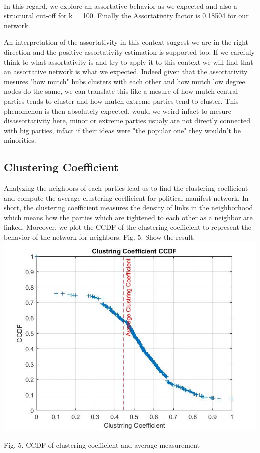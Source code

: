 \documentclass{article}%
\begin{document}
~
\\

In this regard, we explore an assortative behavior as we expected and also a structural cut-off for k = 100. Finally the Assortativity factor is 0.18504 for our network.

An interpretation of the assortativity in this context suggest we are in the right direction and the positive assortativity estimation is supported too. If we carefuly think to what assortativity is and try to apply it to this context we will find that an assortative network is what we expected. Indeed given that the assortativity mesures "how mutch" hubs clusters with each other and how mutch low degree nodes do the same, we can translate this like a mesure of how mutch central parties tends to cluster and how mutch extreme parties tend to cluster. This phenomenon is then absolutely expected, would we weird infact to mesure disassortativity here, minor or extreme parties usualy are not directly connected with big parties, infact if their ideas were "the popular one" they wouldn't be minorities.

\subsection*{Clustering Coefficient}

Analyzing the neighbors of each parties lead us to find the clustering coefficient and compute the average clustering coefficient for political manifest network. In short, the clustering coefficient measures the density of links in the neighborhood which means how the parties which are tightened to each other as a neighbor are linked. Moreover, we plot the CCDF of the clustering coefficient to represent the behavior of the network for neighbors. Fig. 5. Show the result.
\\



\includegraphics[scale=0.5]{Clustering_Coefficient}
\begin{center}
\begin{small}
Fig. 5. CCDF of clustering coefficient and average measurement
\end{small}
\end{center}
\end{document}
